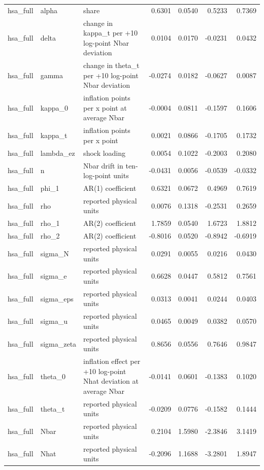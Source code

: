 \begin{tabular}{lllrrrr}
hsa\_full & alpha & share & 0.6301 & 0.0540 & 0.5233 & 0.7369 \\
hsa\_full & delta & change in kappa\_t per +10 log-point Nbar deviation & 0.0104 & 0.0170 & -0.0231 & 0.0432 \\
hsa\_full & gamma & change in theta\_t per +10 log-point Nbar deviation & -0.0274 & 0.0182 & -0.0627 & 0.0087 \\
hsa\_full & kappa\_0 & inflation points per x point at average Nbar & -0.0004 & 0.0811 & -0.1597 & 0.1606 \\
hsa\_full & kappa\_t & inflation points per x point & 0.0021 & 0.0866 & -0.1705 & 0.1732 \\
hsa\_full & lambda\_ez & shock loading & 0.0054 & 0.1022 & -0.2003 & 0.2080 \\
hsa\_full & n & Nbar drift in ten-log-point units & -0.0431 & 0.0056 & -0.0539 & -0.0332 \\
hsa\_full & phi\_1 & AR(1) coefficient & 0.6321 & 0.0672 & 0.4969 & 0.7619 \\
hsa\_full & rho & reported physical units & 0.0076 & 0.1318 & -0.2531 & 0.2659 \\
hsa\_full & rho\_1 & AR(2) coefficient & 1.7859 & 0.0540 & 1.6723 & 1.8812 \\
hsa\_full & rho\_2 & AR(2) coefficient & -0.8016 & 0.0520 & -0.8942 & -0.6919 \\
hsa\_full & sigma\_N & reported physical units & 0.0291 & 0.0055 & 0.0216 & 0.0430 \\
hsa\_full & sigma\_e & reported physical units & 0.6628 & 0.0447 & 0.5812 & 0.7561 \\
hsa\_full & sigma\_eps & reported physical units & 0.0313 & 0.0041 & 0.0244 & 0.0403 \\
hsa\_full & sigma\_u & reported physical units & 0.0465 & 0.0049 & 0.0382 & 0.0570 \\
hsa\_full & sigma\_zeta & reported physical units & 0.8656 & 0.0556 & 0.7646 & 0.9847 \\
hsa\_full & theta\_0 & inflation effect per +10 log-point Nhat deviation at average Nbar & -0.0141 & 0.0601 & -0.1383 & 0.1020 \\
hsa\_full & theta\_t & reported physical units & -0.0209 & 0.0776 & -0.1582 & 0.1444 \\
hsa\_full & Nbar & reported physical units & 0.2104 & 1.5980 & -2.3846 & 3.1419 \\
hsa\_full & Nhat & reported physical units & -0.2096 & 1.1688 & -3.2801 & 1.8947 \\

\end{tabular}
